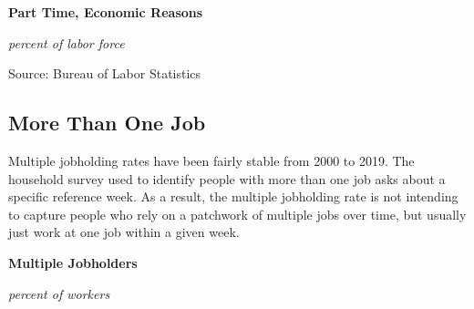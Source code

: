 \documentclass{report}
\makeatletter
\newcommand{\tbllink}[1]{\href{https://raw.githubusercontent.com/bdecon/US-chartbook/master/chartbook/data/#1}{\faTable}}
\newcommand*\short[1]{\expandafter\@gobbletwo\number\numexpr#1\relax}
\newcommand{\shdateaxisticks}{
		date coordinates in=x, axis line style={draw=none},
		xmax={2020-11-15},
		max space between ticks=40,	    
		xtick={{1990-01-01}, {1995-01-01}, {2000-01-01}, 
			{2005-01-01}, {2010-01-01}, {2015-01-01}, {2020-01-01}},
		minor xtick={},
		enlarge y limits={0.06}, enlarge x limits={0.01},
		}
\newcommand{\stdline}[4]{\addplot[very thick, no markers, color=#1] 
		table [x=#2, y=#3, col sep=comma] {#4};	}
\newcommand{\rbars}{
		\fill[color=black!10] (axis cs:{1990-07-01},\pgfkeysvalueof{/pgfplots/ymin}) rectangle 
			(axis cs:{1991-03-01}, \pgfkeysvalueof{/pgfplots/ymax});
		\fill[color=black!10] (axis cs:{2007-12-01},\pgfkeysvalueof{/pgfplots/ymin}) rectangle 
			(axis cs:{2009-07-01}, \pgfkeysvalueof{/pgfplots/ymax});
		\fill[color=black!10] (axis cs:{2001-03-01},\pgfkeysvalueof{/pgfplots/ymin}) rectangle 
			(axis cs:{2001-11-01}, \pgfkeysvalueof{/pgfplots/ymax});
		\fill[color=black!10] (axis cs:{2020-02-01},\pgfkeysvalueof{/pgfplots/ymin}) rectangle 
			(axis cs:{2020-10-01}, \pgfkeysvalueof{/pgfplots/ymax});}
\newcommand{\rebars}{
		\fill[color=black!10] (axis cs:{2007-12-01},\pgfkeysvalueof{/pgfplots/ymin}) rectangle 
			(axis cs:{2009-07-01}, \pgfkeysvalueof{/pgfplots/ymax});
		\fill[color=black!10] (axis cs:{2001-03-01},\pgfkeysvalueof{/pgfplots/ymin}) rectangle 
			(axis cs:{2001-11-01}, \pgfkeysvalueof{/pgfplots/ymax});
		\fill[color=black!10] (axis cs:{2020-02-01},\pgfkeysvalueof{/pgfplots/ymin}) rectangle 
			(axis cs:{2020-10-01}, \pgfkeysvalueof{/pgfplots/ymax});}
\makeatother
\begin{document}
{{{{{{{{{\begin{minipage}{0.43\textwidth}
\normalsize \textbf{Part Time, Economic Reasons}

\footnotesize{\textit{percent of labor force}}

\hspace*{-2mm} 

\footnotesize{Source: Bureau of Labor Statistics} \hfill \tbllink{ptecon.csv} 
\end{minipage}
\hspace{7mm}
\begin{minipage}{0.28\textwidth}
\small 
\end{minipage}

\vspace{8mm}

\subsection*{\color{black!70} \seriffont More Than One Job}

\begin{minipage}{0.76\textwidth}

\small Multiple jobholding rates have been fairly stable from 2000 to 2019. The household survey used to identify people with more than one job asks about a specific reference week. As a result, the multiple jobholding rate is not intending to capture people who rely on a patchwork of multiple jobs over time, but usually just work at one job within a given week. 
\end{minipage}

\vspace{2mm}

\begin{minipage}{0.43\textwidth}

\normalsize \textbf{Multiple Jobholders}

\footnotesize{\textit{percent of workers}}

\hspace*{-2mm} 


\end{minipage}}}}}}}}}}
\end{document}
